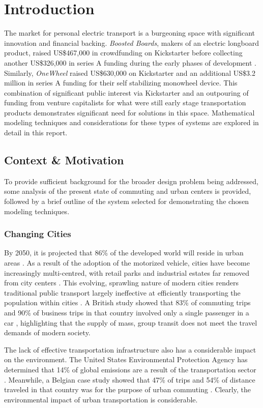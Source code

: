 \section{Introduction}
The market for personal electric transport is a burgeoning space with significant innovation and financial backing. 
\textit{Boosted Boards}, makers of an electric longboard product, raised US\$467,000 in crowdfunding on Kickstarter \cite{boostedkickstart} before collecting another US\$326,000 in series A funding during the early phases of development \cite{boostedfunding}. 
Similarly, \textit{OneWheel} raised US\$630,000 on Kickstarter \cite{onewheelkickstart} and an additional US\$3.2 million in series A funding \cite{onewheelfunding} for their self stabilizing monowheel device. 
This combination of significant public interest via Kickstarter and an outpouring of funding from venture capitalists for what were still early stage transportation products demonstrates significant need for solutions in this space.
Mathematical modeling techniques and considerations for these types of systems are explored in detail in this report.
\subsection{Context \& Motivation}
To provide sufficient background for the broader design problem being addressed, some analysis of the present state of commuting and urban centers is provided, followed by a brief outline of the system selected for demonstrating the chosen modeling techniques.
\subsubsection{Changing Cities}
By 2050, it is projected that 86\% of the developed world will reside in urban areas \cite{Economist}. 
As a result of the adoption of the motorized vehicle, cities have become increasingly multi-centred, with retail parks and industrial estates far removed from city centers \cite{SustainableTransport}. 
This evolving, sprawling nature of modern cities renders traditional public transport largely ineffective at efficiently transporting the population within cities \cite{SustainableTransport}. 
A British study showed that 83\% of commuting trips and 90\% of business trips in that country involved only a single passenger in a car \cite{NTS}, highlighting that the supply of mass, group transit does not meet the travel demands of modern society.

The lack of effective transportation infrastructure also has a considerable impact on the environment. 
The United States Environmental Protection Agency has determined that 14\% of global emissions are a result of the transportation sector \cite{EPA}. 
Meanwhile, a Belgian case study showed that 47\% of trips and 54\% of distance traveled in that country was for the purpose of urban commuting \cite{Belgium}. 
Clearly, the environmental impact of urban transportation is considerable.

